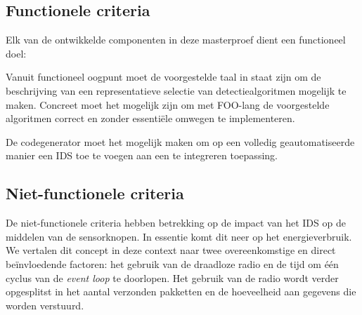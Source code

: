 \vspace{-3mm}

\subsection{Functionele criteria}

Elk van de ontwikkelde componenten in deze masterproef dient een functioneel
doel:

\begin{description}[noitemsep, topsep=0pt, partopsep=1pt]

  \item[Expressiviteit] Vanuit functioneel oogpunt moet de voorgestelde taal in
  staat zijn om de beschrijving van een representatieve selectie van
  detectiealgoritmen mogelijk te maken. Concreet moet het mogelijk zijn om met
  FOO-lang de voorgestelde algoritmen correct en zonder essenti\"ele omwegen
  te implementeren.

  \item[Automatiseerbaarheid] De codegenerator moet het mogelijk maken om op
  een volledig geautomatiseerde manier een IDS toe te voegen aan een te
  integreren toepassing.

\end{description}

\vspace{-3mm}

\subsection{Niet-functionele criteria}

De niet-functionele criteria hebben betrekking op de impact van het IDS op de
middelen van de sensorknopen. In essentie komt dit neer op het energieverbruik.
We vertalen dit concept in deze context naar twee overeenkomstige en direct
be\"invloedende factoren: het gebruik van de draadloze radio en de tijd om
\'e\'en cyclus van de \emph{event loop} te doorlopen. Het gebruik van de radio
wordt verder opgesplitst in het aantal verzonden pakketten en de hoeveelheid
aan gegevens die worden verstuurd.

